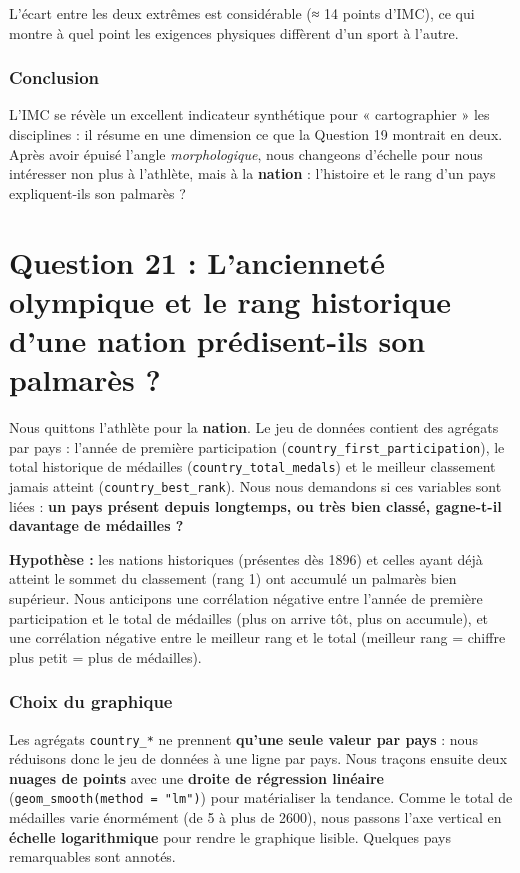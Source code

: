 \documentclass[
]{article}
\begin{document}
L'écart entre les deux extrêmes est considérable (≈ 14 points d'IMC), ce
qui montre à quel point les exigences physiques diffèrent d'un sport à
l'autre.

\subsubsection{Conclusion}\label{conclusion-3}

L'IMC se révèle un excellent indicateur synthétique pour « cartographier
» les disciplines : il résume en une dimension ce que la Question 19
montrait en deux. Après avoir épuisé l'angle \emph{morphologique}, nous
changeons d'échelle pour nous intéresser non plus à l'athlète, mais à la
\textbf{nation} : l'histoire et le rang d'un pays expliquent-ils son
palmarès ?

\section{Question 21 : L'ancienneté olympique et le rang historique
d'une nation prédisent-ils son palmarès
?}\label{question-21-lanciennetuxe9-olympique-et-le-rang-historique-dune-nation-pruxe9disent-ils-son-palmaruxe8s}

Nous quittons l'athlète pour la \textbf{nation}. Le jeu de données
contient des agrégats par pays : l'année de première participation
(\texttt{country\_first\_participation}), le total historique de
médailles (\texttt{country\_total\_medals}) et le meilleur classement
jamais atteint (\texttt{country\_best\_rank}). Nous nous demandons si
ces variables sont liées : \textbf{un pays présent depuis longtemps, ou
très bien classé, gagne-t-il davantage de médailles ?}

\textbf{Hypothèse :} les nations historiques (présentes dès 1896) et
celles ayant déjà atteint le sommet du classement (rang 1) ont accumulé
un palmarès bien supérieur. Nous anticipons une corrélation négative
entre l'année de première participation et le total de médailles (plus
on arrive tôt, plus on accumule), et une corrélation négative entre le
meilleur rang et le total (meilleur rang = chiffre plus petit = plus de
médailles).

\subsubsection{Choix du graphique}\label{choix-du-graphique-10}

Les agrégats \texttt{country\_*} ne prennent \textbf{qu'une seule valeur
par pays} : nous réduisons donc le jeu de données à une ligne par pays.
Nous traçons ensuite deux \textbf{nuages de points} avec une
\textbf{droite de régression linéaire}
(\texttt{geom\_smooth(method\ =\ "lm")}) pour matérialiser la tendance.
Comme le total de médailles varie énormément (de 5 à plus de 2600), nous
passons l'axe vertical en \textbf{échelle logarithmique} pour rendre le
graphique lisible. Quelques pays remarquables sont annotés.
\end{document}

